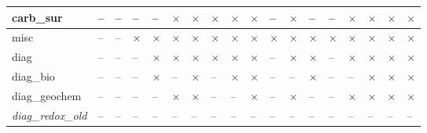 \documentclass[11pt,fleqn]{book} %
\begin{document}
\begin{table}[h]
\begin{tabular}{|l||p{0.2cm}|p{0.25cm}|p{0.25cm}|p{0.25cm}|p{0.25cm}|p{0.25cm}|p{0.25cm}|p{0.25cm}|p{0.25cm}|p{0.25cm}|p{0.25cm}|p{0.25cm}|p{0.25cm}|p{0.25cm}|p{0.25cm}|p{0.25cm}|p{0.25cm}|}
carb\_sur & -- & -- & -- & -- & \(\times\) & \(\times\) & \(\times\) & \(\times\) & \(\times\) & -- & \(\times\) & -- & -- & \(\times\) & \(\times\) & \(\times\) & \(\times\)  \\\hline
misc & -- & -- & \(\times\) & \(\times\) & \(\times\) & \(\times\) & \(\times\) & \(\times\) & \(\times\) & \(\times\) & \(\times\) & \(\times\) & \(\times\) & \(\times\) & \(\times\) & \(\times\) & \(\times\) \\\hline
diag & -- & -- & -- & \(\times\) & \(\times\) & \(\times\) & \(\times\) & \(\times\) & \(\times\) & -- & \(\times\) & \(\times\) & -- & \(\times\) & \(\times\) & \(\times\) & \(\times\)  \\\hline
diag\_bio & -- & -- & -- & \(\times\) & -- & \(\times\) & -- & \(\times\) & \(\times\) & -- & -- & \(\times\) & -- & -- & \(\times\) & \(\times\) & \(\times\)  \\\hline
diag\_geochem & -- & -- & -- & -- & \(\times\) & \(\times\) & -- & -- & \(\times\) & -- & \(\times\) & -- & -- & \(\times\) & \(\times\) & \(\times\) & \(\times\)  \\\hline
\textit{diag\_redox\_old} & -- & -- & -- & -- & -- & -- & -- & -- & -- & -- & -- & -- & -- & -- & -- & -- & -- \\\hline
\end{tabular}
\label{tab:timeserieslevels}
\end{table}


\end{document}

